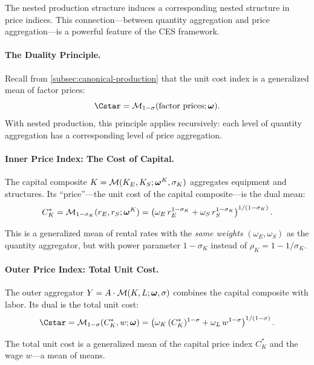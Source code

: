 The nested production structure induces a corresponding nested structure in price indices. This connection---between quantity aggregation and price aggregation---is a powerful feature of the CES framework.

\paragraph{The Duality Principle.}
Recall from \cref{subsec:canonical-production} that the unit cost index is a generalized mean of factor prices:
\begin{equation}
\Cstar = \M_{1-\sigma}(\text{factor prices}; \bom).
\label{eq:duality-principle}
\end{equation}
With nested production, this principle applies recursively: each level of quantity aggregation has a corresponding level of price aggregation.

\paragraph{Inner Price Index: The Cost of Capital.}
The capital composite $K = \mathcal{M}(K_E, K_S; \boldsymbol{\omega}^K, \sigma_K)$ aggregates equipment and structures. Its ``price''---the unit cost of the capital composite---is the dual mean:
\begin{equation}
C_K^* = \mathcal{M}_{1-\sigma_K}(r_E, r_S; \boldsymbol{\omega}^K) = \left( \omega_E \, r_E^{1-\sigma_K} + \omega_S \, r_S^{1-\sigma_K} \right)^{1/(1-\sigma_K)}.
\label{eq:inner-price-index}
\end{equation}

This is a generalized mean of rental rates with the \emph{same weights} $(\omega_E, \omega_S)$ as the quantity aggregator, but with power parameter $1 - \sigma_K$ instead of $\rho_K = 1 - 1/\sigma_K$.

\paragraph{Outer Price Index: Total Unit Cost.}
The outer aggregator $Y = A \cdot \mathcal{M}(K, L; \boldsymbol{\omega}, \sigma)$ combines the capital composite with labor. Its dual is the total unit cost:
\begin{equation}
\Cstar = \M_{1-\sigma}(C_K^*, w; \bom) = \left( \omega_K \, (C_K^*)^{1-\sigma} + \omega_L \, w^{1-\sigma} \right)^{1/(1-\sigma)}.
\label{eq:outer-price-index}
\end{equation}

The total unit cost is a generalized mean of the capital price index $C_K^*$ and the wage $w$---a mean of means.

